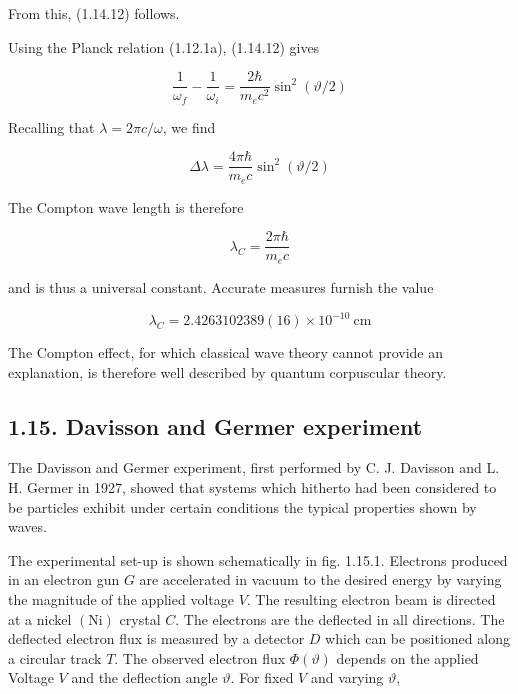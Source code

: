 \documentclass{article}
\begin{document}
From this, (1.14.12) follows.

Using the Planck relation (1.12.1a), (1.14.12) gives
 
\begin{equation*}
\frac{1}{\omega_{f}}-\frac{1}{\omega_{i}}=\frac{2 \hbar}{m_{e} c^{2}} \sin ^{2}(\vartheta / 2) \tag{1.14.16}
\end{equation*}
 

Recalling that $\lambda=2 \pi c / \omega$, we find
 
\begin{equation*}
\Delta \lambda=\frac{4 \pi \hbar}{m_{e} c} \sin ^{2}(\vartheta / 2) \tag{1.14.17}
\end{equation*}
 

The Compton wave length is therefore
 
\begin{equation*}
\lambda_{C}=\frac{2 \pi \hbar}{m_{e} c} \tag{1.14.18}
\end{equation*}
 
and is thus a universal constant. Accurate measures furnish the value
 
\begin{equation*}
\lambda_{C}=2.4263102389(16) \times 10^{-10} \mathrm{~cm} \tag{1.14.19}
\end{equation*}
 

The Compton effect, for which classical wave theory cannot provide an explanation, is therefore well described by quantum corpuscular theory.

\subsection*{1.15. Davisson and Germer experiment}

The Davisson and Germer experiment, first performed by C. J. Davisson and L. H. Germer in 1927, showed that systems which hitherto had been considered to be particles exhibit under certain conditions the typical properties shown by waves.

The experimental set-up is shown schematically in fig. 1.15.1. Electrons produced in an electron gun $G$ are accelerated in vacuum to the desired energy by varying the magnitude of the applied voltage $V$. The resulting electron beam is directed at a nickel $(\mathrm{Ni})$ crystal $C$. The electrons are the deflected in all directions. The deflected electron flux is measured by a detector $D$ which can be positioned along a circular track $T$. The observed electron flux $\Phi(\vartheta)$ depends on the applied Voltage $V$ and the deflection angle $\vartheta$. For fixed $V$ and varying $\vartheta$,
\end{document}
